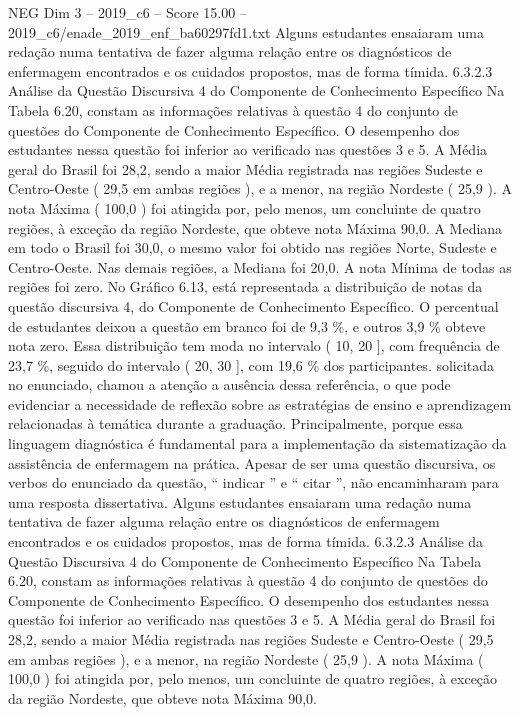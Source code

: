 \begin{textsample}{NEG Dim 3 – 2019\_c6 – Score 15.00 – 2019\_c6/enade\_2019\_enf\_ba60297fd1.txt}
Alguns estudantes ensaiaram uma redação numa tentativa de fazer alguma relação entre os diagnósticos de enfermagem encontrados e os cuidados propostos, mas de forma tímida. 6.3.2.3 Análise da Questão Discursiva 4 do Componente de Conhecimento Específico Na Tabela 6.20, constam as informações relativas à questão 4 do conjunto de questões do Componente de Conhecimento Específico.
O desempenho dos estudantes nessa questão foi inferior ao verificado nas questões 3 e 5.
A Média geral do Brasil foi 28,2, sendo a maior Média registrada nas regiões Sudeste e Centro-Oeste ( 29,5 em ambas regiões ), e a menor, na região Nordeste ( 25,9 ).
A nota Máxima ( 100,0 ) foi atingida por, pelo menos, um concluinte de quatro regiões, à exceção da região Nordeste, que obteve nota Máxima 90,0.
A Mediana em todo o Brasil foi 30,0, o mesmo valor foi obtido nas regiões Norte, Sudeste e Centro-Oeste.
Nas demais regiões, a Mediana foi 20,0.
A nota Mínima de todas as regiões foi zero.
No Gráfico 6.13, está representada a distribuição de notas da questão discursiva 4, do Componente de Conhecimento Específico.
O percentual de estudantes deixou a questão em branco foi de 9,3 \%, e outros 3,9 \% obteve nota zero.
Essa distribuição tem moda no intervalo ( 10, 20 ], com frequência de 23,7 \%, seguido do intervalo ( 20, 30 ], com 19,6 \% dos participantes. solicitada no enunciado, chamou a atenção a ausência dessa referência, o que pode evidenciar a necessidade de reflexão sobre as estratégias de ensino e aprendizagem relacionadas à temática durante a graduação.
Principalmente, porque essa linguagem diagnóstica é fundamental para a implementação da sistematização da assistência de enfermagem na prática.
Apesar de ser uma questão discursiva, os verbos do enunciado da questão, “ indicar ” e “ citar ”, não encaminharam para uma resposta dissertativa.
Alguns estudantes ensaiaram uma redação numa tentativa de fazer alguma relação entre os diagnósticos de enfermagem encontrados e os cuidados propostos, mas de forma tímida. 6.3.2.3 Análise da Questão Discursiva 4 do Componente de Conhecimento Específico Na Tabela 6.20, constam as informações relativas à questão 4 do conjunto de questões do Componente de Conhecimento Específico.
O desempenho dos estudantes nessa questão foi inferior ao verificado nas questões 3 e 5.
A Média geral do Brasil foi 28,2, sendo a maior Média registrada nas regiões Sudeste e Centro-Oeste ( 29,5 em ambas regiões ), e a menor, na região Nordeste ( 25,9 ).
A nota Máxima ( 100,0 ) foi atingida por, pelo menos, um concluinte de quatro regiões, à exceção da região Nordeste, que obteve nota Máxima 90,0.

\end{textsample}

